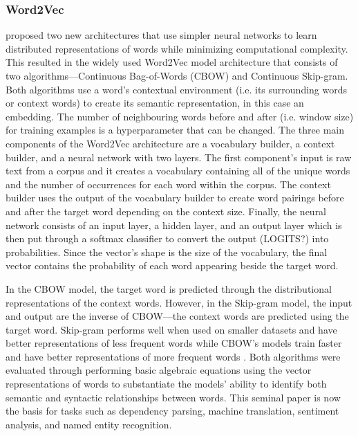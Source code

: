 
\subsubsection{Word2Vec}
\citet{mikolov2013efficient} proposed two new architectures that use simpler neural networks to learn distributed representations of words while minimizing computational complexity. This resulted in the widely used Word2Vec model architecture that consists of two algorithms—Continuous Bag-of-Words (CBOW) and Continuous Skip-gram. Both algorithms use a word’s contextual environment (i.e. its surrounding words or context words) to create its semantic representation, in this case an embedding. The number of neighbouring words before and after (i.e. window size) for training examples is a hyperparameter that can be changed. The three main components of the Word2Vec architecture are a vocabulary builder, a context builder, and a neural network with two layers. The first component’s input is raw text from a corpus and it creates a vocabulary containing all of the unique words and the number of occurrences for each word within the corpus. The context builder uses the output of the vocabulary builder to create word pairings before and after the target word depending on the context size. Finally, the neural network consists of an input layer, a hidden layer, and an output layer which is then put through a softmax classifier to convert the output (LOGITS?) into probabilities. Since the vector’s shape is the size of the vocabulary, the final vector contains the probability of each word appearing beside the target word. 

In the CBOW model, the target word is predicted through the distributional representations of the context words. However, in the Skip-gram model, the input and output are the inverse of CBOW—the context words are predicted using the target word.  Skip-gram performs well when used on smaller datasets and have better representations of less frequent words while CBOW’s models train faster and have better representations of more frequent words \citep{mikolov2013efficient}. Both algorithms were evaluated through performing basic algebraic equations using the vector representations of words to substantiate the models’ ability to identify both semantic and syntactic relationships between words. This seminal paper is now the basis for tasks such as dependency parsing, machine translation, sentiment analysis, and named entity recognition.


